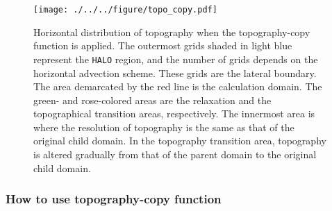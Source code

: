 \begin{figure}[tbh]
\begin{center}
  \texttt{[image: ./../../figure/topo\_copy.pdf]}\\
  \caption{Horizontal distribution of topography when the topography-copy function is applied.
    The outermost grids shaded in light blue represent the \texttt{HALO} region, and the number of grids depends on
    the horizontal advection scheme.
    These grids are the lateral boundary. The area demarcated by the red line is the calculation domain.
    The green- and rose-colored areas are the relaxation and the topographical transition areas, respectively.
    The innermost area is where the resolution of topography is the same as that of the original child domain.
    In the topography transition area, topography is altered gradually from that of
    the parent domain to the original child domain.
}
  \label{fig_topocopy}
\end{center}
\end{figure}



\subsubsection{How to use topography-copy function}

